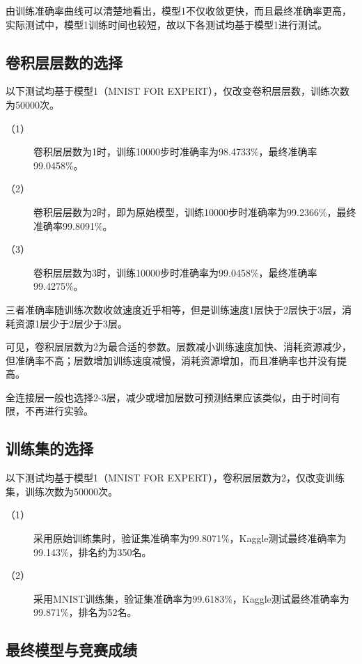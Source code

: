 \documentclass{article}
\begin{document}
由训练准确率曲线可以清楚地看出，模型1不仅收敛更快，而且最终准确率更高，实际测试中，模型1训练时间也较短，故以下各测试均基于模型1进行测试。


\subsection{卷积层层数的选择}

以下测试均基于模型1（MNIST FOR EXPERT），仅改变卷积层层数，训练次数为50000次。

\begin{description}

\item[（1）]卷积层层数为1时，训练10000步时准确率为98.4733\%，最终准确率99.0458\%。

\item[（2）]卷积层层数为2时，即为原始模型，训练10000步时准确率为99.2366\%，最终准确率99.8091\%。
\item[（3）]
卷积层层数为3时，训练10000步时准确率为99.0458\%，最终准确率99.4275\%。

\end{description}
三者准确率随训练次数收敛速度近乎相等，但是训练速度1层快于2层快于3层，消耗资源1层少于2层少于3层。

可见，卷积层层数为2为最合适的参数。层数减小训练速度加快、消耗资源减少，但准确率不高；层数增加训练速度减慢，消耗资源增加，而且准确率也并没有提高。

全连接层一般也选择2-3层，减少或增加层数可预测结果应该类似，由于时间有限，不再进行实验。

\subsection{训练集的选择}

以下测试均基于模型1（MNIST FOR EXPERT），卷积层层数为2，仅改变训练集，训练次数为50000次。

\begin{description}

\item[（1）]采用原始训练集时，验证集准确率为99.8071\%，Kaggle测试最终准确率为99.143\%，排名约为350名。

\item[（2）]采用MNIST训练集，验证集准确率为99.6183\%，Kaggle测试最终准确率为99.871\%，排名为52名。

\end{description}
\subsection{最终模型与竞赛成绩}
\end{document}

